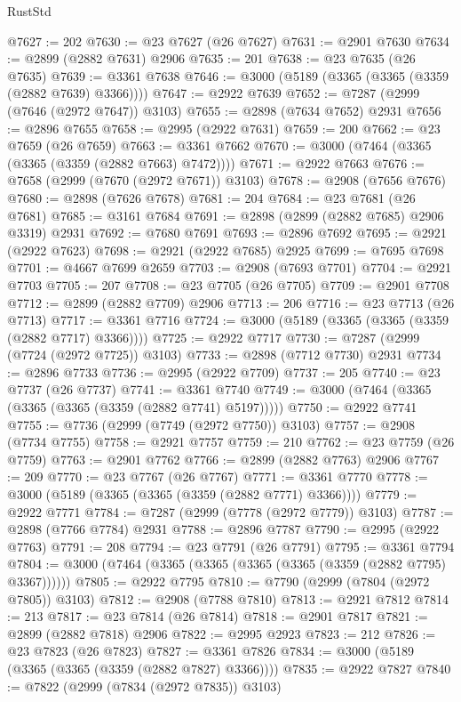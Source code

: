 \begin{lexlean}{RustStd}
\begin{coremodule}
@7627 := 202
@7630 := @23 @7627 (@26 @7627)
@7631 := @2901 @7630
@7634 := @2899 (@2882 @7631) @2906
@7635 := 201
@7638 := @23 @7635 (@26 @7635)
@7639 := @3361 @7638
@7646 := @3000 (@5189 (@3365 (@3365 (@3359 (@2882 @7639) @3366))))
@7647 := @2922 @7639
@7652 := @7287 (@2999 (@7646 (@2972 @7647)) @3103)
@7655 := @2898 (@7634 @7652) @2931
@7656 := @2896 @7655
@7658 := @2995 (@2922 @7631)
@7659 := 200
@7662 := @23 @7659 (@26 @7659)
@7663 := @3361 @7662
@7670 := @3000 (@7464 (@3365 (@3365 (@3359 (@2882 @7663) @7472))))
@7671 := @2922 @7663
@7676 := @7658 (@2999 (@7670 (@2972 @7671)) @3103)
@7678 := @2908 (@7656 @7676)
@7680 := @2898 (@7626 @7678)
@7681 := 204
@7684 := @23 @7681 (@26 @7681)
@7685 := @3161 @7684
@7691 := @2898 (@2899 (@2882 @7685) @2906 @3319) @2931
@7692 := @7680 @7691
@7693 := @2896 @7692
@7695 := @2921 (@2922 @7623)
@7698 := @2921 (@2922 @7685) @2925
@7699 := @7695 @7698
@7701 := @4667 @7699 @2659
@7703 := @2908 (@7693 @7701)
@7704 := @2921 @7703
@7705 := 207
@7708 := @23 @7705 (@26 @7705)
@7709 := @2901 @7708
@7712 := @2899 (@2882 @7709) @2906
@7713 := 206
@7716 := @23 @7713 (@26 @7713)
@7717 := @3361 @7716
@7724 := @3000 (@5189 (@3365 (@3365 (@3359 (@2882 @7717) @3366))))
@7725 := @2922 @7717
@7730 := @7287 (@2999 (@7724 (@2972 @7725)) @3103)
@7733 := @2898 (@7712 @7730) @2931
@7734 := @2896 @7733
@7736 := @2995 (@2922 @7709)
@7737 := 205
@7740 := @23 @7737 (@26 @7737)
@7741 := @3361 @7740
@7749 := @3000 (@7464 (@3365 (@3365 (@3365 (@3359 (@2882 @7741) @5197)))))
@7750 := @2922 @7741
@7755 := @7736 (@2999 (@7749 (@2972 @7750)) @3103)
@7757 := @2908 (@7734 @7755)
@7758 := @2921 @7757
@7759 := 210
@7762 := @23 @7759 (@26 @7759)
@7763 := @2901 @7762
@7766 := @2899 (@2882 @7763) @2906
@7767 := 209
@7770 := @23 @7767 (@26 @7767)
@7771 := @3361 @7770
@7778 := @3000 (@5189 (@3365 (@3365 (@3359 (@2882 @7771) @3366))))
@7779 := @2922 @7771
@7784 := @7287 (@2999 (@7778 (@2972 @7779)) @3103)
@7787 := @2898 (@7766 @7784) @2931
@7788 := @2896 @7787
@7790 := @2995 (@2922 @7763)
@7791 := 208
@7794 := @23 @7791 (@26 @7791)
@7795 := @3361 @7794
@7804 := @3000 (@7464 (@3365 (@3365 (@3365 (@3365 (@3359 (@2882 @7795) @3367))))))
@7805 := @2922 @7795
@7810 := @7790 (@2999 (@7804 (@2972 @7805)) @3103)
@7812 := @2908 (@7788 @7810)
@7813 := @2921 @7812
@7814 := 213
@7817 := @23 @7814 (@26 @7814)
@7818 := @2901 @7817
@7821 := @2899 (@2882 @7818) @2906
@7822 := @2995 @2923
@7823 := 212
@7826 := @23 @7823 (@26 @7823)
@7827 := @3361 @7826
@7834 := @3000 (@5189 (@3365 (@3365 (@3359 (@2882 @7827) @3366))))
@7835 := @2922 @7827
@7840 := @7822 (@2999 (@7834 (@2972 @7835)) @3103)

\end{coremodule}
\end{lexlean}
